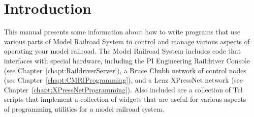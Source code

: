 
\chapter{Introduction}
\label{chapt:Introduction}

This manual presents some information about how to write programs that
use various parts of Model Railroad System to control and manage various
aspects of operating your model railroad.  The Model Railroad System
includes code that interfaces with special hardware, including the PI
Engineering Raildriver Console (see
Chapter~\ref{chapt:RaildriverServer}), a Bruce Chubb network of control
nodes (see  Chapter~\ref{chapt:CMRIProgramming}), and a Lenz XPressNet
network (see Chapter~\ref{chapt:XPressNetProgramming}).  Also included
are a collection of Tcl scripts that implement a collection of widgets
that are useful for various aspects of programming utilities for a model
railroad system.
